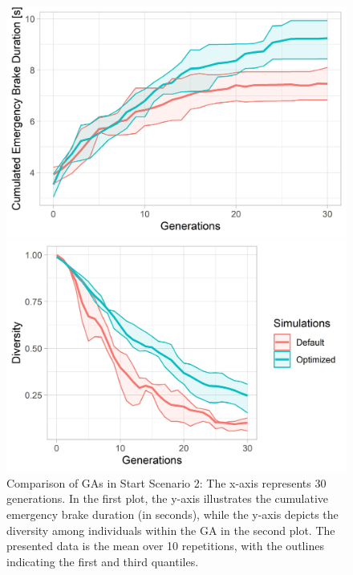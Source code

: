 \begin{figure}[ht] 
	\begin{minipage}[b]{0.5\linewidth}
		\centering
		\includegraphics[width=1\linewidth]{simulations/evaluation/plots/sim_2_ga_generations} 
	\end{minipage}%
	\begin{minipage}[b]{0.5\linewidth}
		\centering
		\includegraphics[width=1\linewidth]{simulations/evaluation/plots/sim_2_ga_diversity} 
	\end{minipage} 
	\caption{Comparison of GAs in Start Scenario 2: The x-axis represents 30 generations. In the first plot, the y-axis illustrates the cumulative emergency brake duration (in seconds), while the y-axis depicts the diversity among individuals within the GA in the second plot. The presented data is the mean over 10 repetitions, with the outlines indicating the first and third quantiles.}
	\label{fig:evaluation:sim_2_ga_comparison}
\end{figure}

